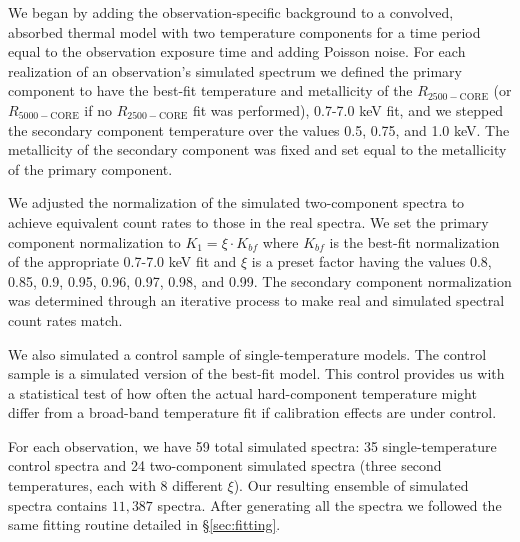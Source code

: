 \documentclass{emulateapj}
\begin{document}
We began by adding the observation-specific background to a convolved,
absorbed thermal model with two temperature components for a time
period equal to the observation exposure time and adding Poisson
noise. For each realization of an observation's simulated spectrum we
defined the primary component to have the best-fit temperature and
metallicity of the $R_{2500-\mathrm{CORE}}$ (or $R_{5000-\mathrm{CORE}}$
if no $R_{2500-\mathrm{CORE}}$ fit was performed), 0.7-7.0 keV fit, and
we stepped the secondary component temperature over the values 0.5,
0.75, and 1.0 keV. The metallicity of the secondary component was
fixed and set equal to the metallicity of the primary component.

We adjusted the normalization of the simulated two-component spectra to
achieve equivalent count rates to those in the real spectra. We set
the primary component normalization to $K_1 = \xi \cdot K_{bf}$ where
$K_{bf}$ is the best-fit normalization of the appropriate
0.7-7.0 keV fit and $\xi$ is a preset factor having the values 0.8,
0.85, 0.9, 0.95, 0.96, 0.97, 0.98, and 0.99. The secondary component
normalization was determined through an iterative process to make real
and simulated spectral count rates match.

We also simulated a control sample of single-temperature models. The
control sample is a simulated version of the best-fit model. This
control provides us with a statistical test of how often the actual
hard-component temperature might differ from a broad-band temperature
fit if calibration effects are under control.

For each observation, we have 59 total simulated spectra: 35
single-temperature control spectra and 24 two-component simulated
spectra (three second temperatures, each with 8 different $\xi$). Our
resulting ensemble of simulated spectra contains $11,387$
spectra. After generating all the spectra we followed the same fitting
routine detailed in \S\ref{sec:fitting}.
\end{document}
